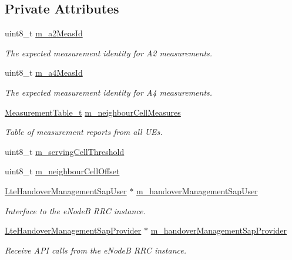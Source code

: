 \subsection*{Private Attributes}
\begin{DoxyCompactItemize}
\item 
uint8\+\_\+t \hyperlink{classns3_1_1A2A4RsrqHandoverAlgorithm_ac52e42e6ee41a0faffdcbc75ff7e2e02}{m\+\_\+a2\+Meas\+Id}
\begin{DoxyCompactList}\small\item\em The expected measurement identity for A2 measurements. \end{DoxyCompactList}\item 
uint8\+\_\+t \hyperlink{classns3_1_1A2A4RsrqHandoverAlgorithm_acad13d470305131b7cfa66f5feb0f0bf}{m\+\_\+a4\+Meas\+Id}
\begin{DoxyCompactList}\small\item\em The expected measurement identity for A4 measurements. \end{DoxyCompactList}\item 
\hyperlink{classns3_1_1A2A4RsrqHandoverAlgorithm_a27c0f07941cacc1c54a799a27ea7821c}{Measurement\+Table\+\_\+t} \hyperlink{classns3_1_1A2A4RsrqHandoverAlgorithm_ab02d6372aec766c1d6e7611111456fa4}{m\+\_\+neighbour\+Cell\+Measures}
\begin{DoxyCompactList}\small\item\em Table of measurement reports from all U\+Es. \end{DoxyCompactList}\item 
uint8\+\_\+t \hyperlink{classns3_1_1A2A4RsrqHandoverAlgorithm_acb5609bb57548a7cd9fe92fbef4dd99b}{m\+\_\+serving\+Cell\+Threshold}
\item 
uint8\+\_\+t \hyperlink{classns3_1_1A2A4RsrqHandoverAlgorithm_afe15ce0bd178565ef3f42d83ada4428b}{m\+\_\+neighbour\+Cell\+Offset}
\item 
\hyperlink{classns3_1_1LteHandoverManagementSapUser}{Lte\+Handover\+Management\+Sap\+User} $\ast$ \hyperlink{classns3_1_1A2A4RsrqHandoverAlgorithm_a117b9e0cb1751dc8b2b96532c2915679}{m\+\_\+handover\+Management\+Sap\+User}
\begin{DoxyCompactList}\small\item\em Interface to the e\+NodeB R\+RC instance. \end{DoxyCompactList}\item 
\hyperlink{classns3_1_1LteHandoverManagementSapProvider}{Lte\+Handover\+Management\+Sap\+Provider} $\ast$ \hyperlink{classns3_1_1A2A4RsrqHandoverAlgorithm_a5c2d8213a131a7d934c2b5ef4907597b}{m\+\_\+handover\+Management\+Sap\+Provider}
\begin{DoxyCompactList}\small\item\em Receive A\+PI calls from the e\+NodeB R\+RC instance. \end{DoxyCompactList}\end{DoxyCompactItemize}
